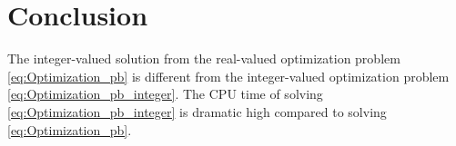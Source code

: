 \section{Conclusion}
The integer-valued solution from the real-valued optimization problem \eqref{eq:Optimization_pb} is different from the integer-valued optimization problem \eqref{eq:Optimization_pb_integer}. The CPU time of solving \eqref{eq:Optimization_pb_integer} is dramatic high compared to solving \eqref{eq:Optimization_pb}.